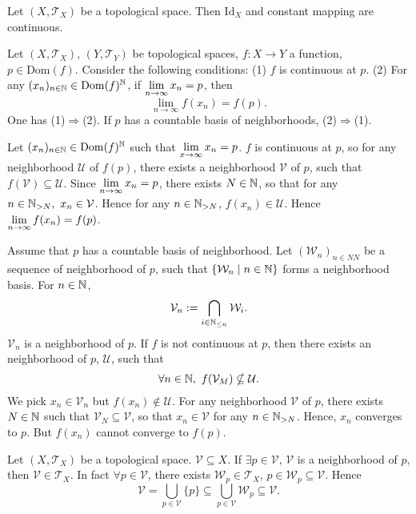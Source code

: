 \begin{exampleenv}
    Let $\left(X,\mathscr{T}_X\right)$ be a topological space. Then $\mathrm{Id}_X$ and constant mapping are continuous.
\end{exampleenv}
\begin{theoremenv}
Let $\left(X,\mathscr{T}_X\right)$, $\left(Y,\mathscr{T}_Y\right)$ be topological spaces, $f:X\longrightarrow Y$ a function, $p\in \mathrm{Dom}(f)$. Consider the following conditions:
\newline
(1) $f$ is continuous at $p$.
\newline
(2) For any $(x_n)_{n\in \mathbb{N}}\in \mathrm{Dom}(f)^{\mathbb{N}}$, if $\displaystyle \lim_{n\rightarrow \infty}x_n=p$, then 
$$\lim_{n\rightarrow \infty}f(x_n)=f(p).$$
One has (1)$\Rightarrow$(2). If $p$ has a countable basis of neighborhoods, (2)$\Rightarrow$(1).
\end{theoremenv}
\begin{proofenv}
    Let $(x_n)_{n\in\mathbb{N}}\in \mathrm{Dom}(f)^{\mathbb{N}}$ such that $\displaystyle \lim_{x\rightarrow \infty}x_n=p$. $f$ is continuous at $p$, so for any neighborhood $\mathcal{U}$ of $f(p)$, there exists a neighborhood $\mathcal{V}$ of $p$, such that $f(\mathcal{V})\subseteq\mathcal{U}$. Since $\displaystyle \lim_{n\rightarrow \infty}x_n=p$, there exists $N\in \mathbb{N}$, so that for any $n\in \mathbb{N}_{>N},\ x_n \in \mathcal{V}$. Hence for any $n\in \mathbb{N}_{>N}$, $f(x_n)\in \mathcal{U}$. Hence $\displaystyle \lim_{n\rightarrow \infty}f(x_n)=f(p)$.

    Assume that $p$ has a countable basis of neighborhood. Let $(\mathcal{W}_n)_{n\in NN}$ be a sequence of neighborhood of $p$, such that $\{\mathcal{W}_n\mid n\in \mathbb{N}\}$ forms a neighborhood basis. For $n\in \mathbb{N}$, 
    $$\mathcal{V}_n:=\bigcap_{i\in \mathbb{N}_{\le n}}\mathcal{W}_i.$$
    $\mathcal{V}_n$ is a neighborhood of $p$. If $f$ is not continuous at $p$, then there exists an neighborhood of $p$, $\mathcal{U}$, such that 
    $$\forall n\in \NN,\ f(\mathcal{V}_M)\nsubseteq\mathcal{U}.$$
    We pick $x_n\in \mathcal{V}_n$ but $f(x_n)\notin \mathcal{U}.$ For any neighborhood $\mathcal{V}$ of $p$, there exists $N\in \mathbb{N}$ such that $\mathcal{V}_N\subseteq \mathcal{V}$, so that $x_n\in \mathcal{V}$ for any $n\in \mathbb{N}_{>N}$. Hence, $x_n$ converges to $p$. But $f(x_n)$ cannot converge to $f(p)$.
\end{proofenv}
\begin{lemmaenv}
    Let $(X,\mathscr{T}_X)$ be a topological space. $\mathcal{V}\subseteq X$. If $\exists p\in \mathcal{V}$, $\mathcal{V}$ is a neighborhood of $p$, then $\mathcal{V}\in \mathscr{T}_X$. In fact $\forall p\in \mathcal{V}$, there exists $\mathcal{W}_p\in \mathscr{T}_X$, $p\in\mathcal{W}_p\subseteq \mathcal{V}$. Hence 
    $$\mathcal{V}=\bigcup_{p\in \mathcal{V}}\{p\}\subseteq \bigcup_{p\in \mathcal{V}}\mathcal{W}_p\subseteq \mathcal{V}.$$
\end{lemmaenv}
